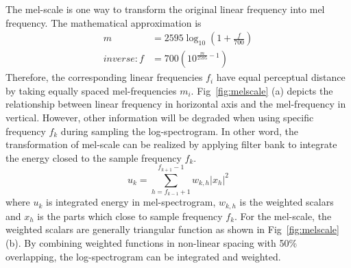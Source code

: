 The mel-scale is one way to transform the original linear frequency into mel frequency. The mathematical approximation is 
\begin{align}
m&=2595\log_{10}(1+\frac {f}{700})\\
inverse: f&=700(10^{\frac{m}{2595}-1})
\end{align}
Therefore, the corresponding linear frequencies $f_i$ have equal perceptual distance by taking equally spaced mel-frequencies $m_i$. Fig~\ref{fig:melscale} (a) depicts the relationship between linear frequency in horizontal axis and the mel-frequency in vertical. However, other information will be degraded when using specific frequency $f_k$ during sampling the log-spectrogram. In other word, the transformation of mel-scale can be realized by applying filter bank to integrate the energy closed to the sample frequency $f_k$. 
\begin{equation}
u_k = \sum_{h=f_{k-1}+1}^{f_{k+1}-1} w_{k,h} |x_h|^2
\end{equation}
where $u_k$ is integrated energy in mel-spectrogram, $w_{k,h}$ is the weighted scalars and $x_h$ is the parts which close to sample frequency $f_k$. For the mel-scale, the weighted scalars are generally triangular function as shown in Fig~\ref{fig:melscale} (b). By combining weighted functions in non-linear spacing with 50\% overlapping, the log-spectrogram can be integrated and weighted.\par
